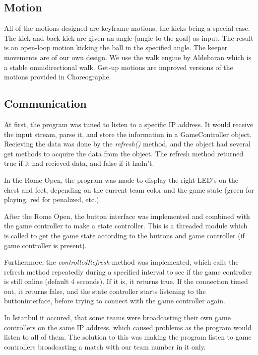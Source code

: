 \documentclass[11pt,a4paper,oneside]{article}
\begin{document}
\subsection{Motion}
All of the motions designed are keyframe motions, the kicks being a special case. The kick and back kick are given an angle (angle to the goal) as input. The result is an open-loop motion kicking the ball in the specified angle. The keeper movements are of our own design. We use the walk engine by Aldebaran which is a stable omnidirectional walk. Get-up motions are improved versions of the motions provided in Choreographe. 

\subsection{Communication}
\label{sec:communication}
At first, the program was tuned to listen to a specific IP address. It would receive the input stream, parse it, and store the information in a GameController object. Recieving the data was done by the \textit{refresh()} method, and the object had several get methods to acquire the data from the object. The refresh method returned true if it had recieved data, and false if it hadn't.

In the Rome Open, the program was made to display the right LED’s on the chest and feet, depending on the current team color and the game state (green for playing, red for penalized, etc.). 

After the Rome Open, the button interface was implemented and combined with the game controller to make a state controller. This is a threaded module which is called to get the game state according to the buttons and game controller (if game controller is present).

Furthermore, the \textit{controlledRefresh} method was implemented, which calls the refresh method repeatedly during a specified interval to see if the game controller is still online (default 4 seconds). If it is, it returns true. If the connection timed out, it returns false, and the state controller starts listening to the buttoninterface, before trying to connect with the game controller again.

In Istanbul it occured, that some teams were broadcasting their own game controllers on the same IP address, which caused problems as the program would listen to all of them. The solution to this was making the program listen to game controllers broadcasting a match with our team number in it only.  
\end{document}
